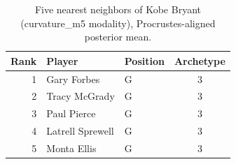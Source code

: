 \begin{table}[htbp]
  \centering\small
  \begin{tabular}{rllc}
    \toprule
    Rank & Player & Position & Archetype \\
    \midrule
    1 & Gary Forbes & G & 3 \\
    2 & Tracy McGrady & G & 3 \\
    3 & Paul Pierce & G & 3 \\
    4 & Latrell Sprewell & G & 3 \\
    5 & Monta Ellis & G & 3 \\
    \bottomrule
  \end{tabular}
  \caption{Five nearest neighbors of Kobe Bryant (curvature_m5 modality), Procrustes-aligned posterior mean.}
  \label{tab:Kobe_Bryant_neighbors_curvature_m5}
\end{table}

